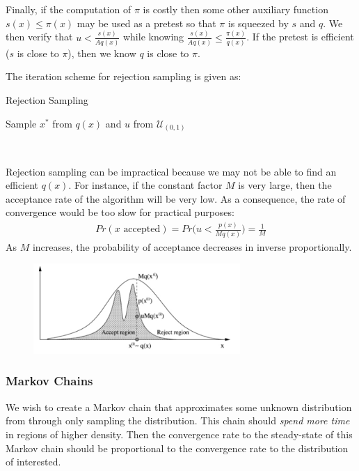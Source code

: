 \documentclass[paper=a4, fontsize=12pt]{scrartcl} %
\numberwithin{equation}{section} %
\numberwithin{figure}{section} %
\numberwithin{table}{section} %
\begin{document}
Finally, if the computation of $\pi$ is costly then some other auxiliary function $s(x) \le \pi(x)$ may be used as a pretest 
so that $\pi$ is squeezed by $s$ and $q$. We then verify that $u < \frac{s(x)}{Aq(x)}$ while knowing $\frac{s(x)}{Aq(x)} \le \frac{\pi(x)}{q(x)} $. 
If the pretest is efficient ($s$ is close to $\pi$), then we know $q$ is close to $\pi$.

The iteration scheme for rejection sampling is given as: \\[0.5cm]
\begin{algorithm}[H]
    \caption{Rejection Sampling}
    \SetAlgoLined
         {
            Sample $x^*$ from $q(x)$ and $u$ from $\mathcal{U}_{(0,1)}$ \:
            
            \
        }
\end{algorithm}
Rejection sampling can be impractical because we may not be able to find an efficient $q(x)$. For instance, 
if the constant factor $M$ is very large, then the acceptance rate of the algorithm 
will be very low. As a consequence, the rate of convergence would be too slow for 
practical purposes:
\begin{align*}
    Pr(x \text{ accepted}) = Pr\Big(u < \frac{p(x)}{Mq(x)} \Big) = \frac{1}{M}
\end{align*}
As $M$ increases, the probability of acceptance decreases in inverse proportionally.
\begin{figure}[H]
    \centering
    \includegraphics[width=0.7\textwidth]{images/rejection}
    \caption{}
\end{figure}

\subsubsection{Markov Chains}
We wish to create a Markov chain that approximates some unknown distribution from through 
only sampling the distribution. This chain should \textit{spend more time} in regions of 
higher density. Then the convergence rate to the steady-state of this Markov chain should 
be proportional to the convergence rate to the distribution of interested.
\end{document}
